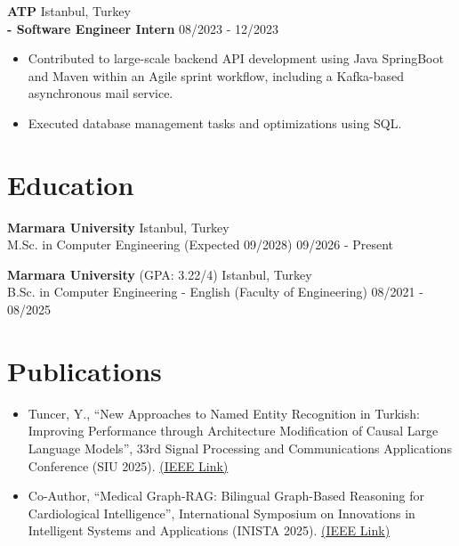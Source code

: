 \documentclass[paper=a4,fontsize=10pt]{scrartcl}
\begin{document}
\textbf{ATP} \hfill Istanbul, Turkey\\
\textbf{- Software Engineer Intern} \hfill 08/2023 - 12/2023
\begin{itemize}[noitemsep, topsep=2pt, parsep=0pt, partopsep=0pt, leftmargin=*]
    \item Contributed to large-scale backend API development using Java SpringBoot and Maven within an Agile sprint workflow, including a Kafka-based asynchronous mail service.
    \item Executed database management tasks and optimizations using SQL.
\end{itemize}

\section*{Education}
\textbf{Marmara University} \hfill Istanbul, Turkey\\
M.Sc. in Computer Engineering (Expected 09/2028) \hfill 09/2026 - Present
\vspace{3pt}

\textbf{Marmara University} (GPA: 3.22/4) \hfill Istanbul, Turkey\\
B.Sc. in Computer Engineering - English (Faculty of Engineering) \hfill 08/2021 - 08/2025

\section*{Publications}
\begin{itemize}[noitemsep, topsep=2pt, parsep=0pt, partopsep=0pt, leftmargin=*]
    \item Tuncer, Y., “New Approaches to Named Entity Recognition in Turkish: Improving Performance through Architecture Modification of Causal Large Language Models”, 33rd Signal Processing and Communications Applications Conference (SIU 2025). \href{https://ieeexplore.ieee.org/document/11112472}{(\underline{IEEE Link})}
    \item Co-Author, “Medical Graph-RAG: Bilingual Graph-Based Reasoning for Cardiological Intelligence”, International Symposium on Innovations in Intelligent Systems and Applications (INISTA 2025). \href{https://ieeexplore.ieee.org/document/11249583}{(\underline{IEEE Link})}
\end{itemize}
\end{document}
